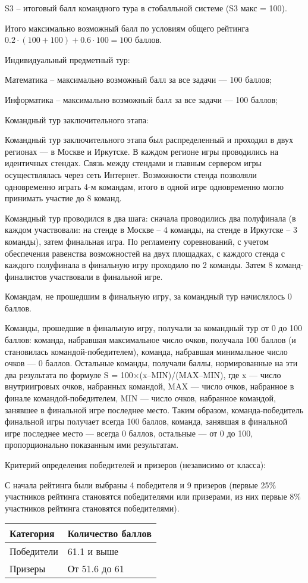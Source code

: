 S3 – итоговый балл командного тура в стобалльной системе (S3 макс = 100).

Итого максимально возможный балл по условиям общего рейтинга $0.2 \cdot (100+100) + 0.6 \cdot 100 = 100$ баллов.

Индивидуальный предметный тур:

Математика – максимально возможный балл за все задачи — 100 баллов;

Информатика – максимально возможный балл за все задачи — 100 баллов;

Командный тур заключительного этапа:

Командный тур заключительного этапа был распределенный и проходил в двух регионах — в Москве и Иркутске. В каждом регионе игры проводились на идентичных стендах. Связь между стендами и главным сервером игры осуществлялась через сеть Интернет. Возможности стенда позволяли одновременно играть 4-м командам, итого в одной игре одновременно могло принимать участие до 8 команд.

Командный тур проводился в два шага: сначала проводились два полуфинала (в каждом участвовали: на стенде в Москве – 4 команды, на стенде в Иркутске – 3 команды), затем финальная игра. По регламенту соревнований, с учетом обеспечения равенства возможностей на двух площадках, с каждого стенда с каждого полуфинала в финальную игру проходило по 2 команды. Затем 8 команд-финалистов участвовали в финальной игре.

Командам, не прошедшим в финальную игру, за командный тур начислялось 0 баллов.

Команды, прошедшие в финальную игру, получали за командный тур от 0 до 100 баллов: команда, набравшая максимальное число очков, получала 100 баллов (и становилась командой-победителем), команда, набравшая минимальное число очков — 0 баллов. Остальные команды, получали баллы, нормированные на эти два результата по формуле S = 100×(x–MIN)/(MAX–MIN), где x — число внутриигровых очков, набранных командой, MAX — число очков, набранное в финале командой-победителем, MIN — число очков, набранное командой, занявшее в финальной игре последнее место. Таким образом, команда-победитель финальной игры получает всегда 100 баллов, команда, занявшая в финальной игре последнее место — всегда 0 баллов, остальные — от 0 до 100, пропорционально показанным ими результатам.

Критерий определения победителей и призеров (независимо от класса):

С начала рейтинга были выбраны 4 победителя и 9 призеров (первые 25\% участников рейтинга становятся победителями или призерами, из них первые 8\% участников рейтинга становятся победителями).

\begin{center}
    \begin{tabular}{|l|l|}
        \hline
        Категория&Количество баллов\\
        \hline
        Победители&61.1 и выше\\
        \hline
        Призеры&От 51.6 до 61\\
        \hline
    \end{tabular}
\end{center}
